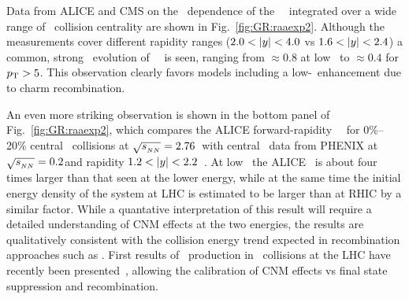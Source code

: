 Data from ALICE and CMS on the \pT\ dependence of the \jpsi\ \Raa\ integrated over a wide range of \PbPb\ collision centrality
are shown in Fig.~\ref{fig:GR:raaexp2}. Although the measurements
cover different rapidity ranges ($2.0 < |y| < 4.0$ vs $ 1.6  < |y| < 2.4 $)
a common, strong \pT\ evolution of \jpsi\ \Raa\ is seen, ranging from $\approx 0.8$ at low \pT\ to $\approx 0.4$ for $\mbox{$p_{\mathrm{T}}$} > 5$\GeVc.
This observation clearly favors models including a low-\pT\ enhancement due to charm recombination.

An even more striking observation is shown in the bottom panel of Fig.~\ref{fig:GR:raaexp2}, which compares
the ALICE forward-rapidity \jpsi\ \Raa\ for 0\%--20\% central \PbPb\ collisions at  $\sqrt{s_{_{NN}}} = 2.76$\TeV\
with central \AuAu\ data from PHENIX at $\sqrt{s_{_{NN}}} = 0.2$\GeV and rapidity $1.2 < |y| < 2.2$~\cite{Adare:2011yf}.
At low \pT\ the ALICE \Raa\ is about four times larger than that seen at the lower energy, while
at the same time the initial energy density of the system at LHC is estimated to be larger than at
RHIC by a similar factor. While a quantative interpretation of this result will require
a detailed understanding of CNM effects at the two energies, the results are qualitatively consistent
with the collision energy trend expected in recombination approaches such as
\cite{Zhao:2007hh,Zhou:2013aea,Liu:2009nb}.
First results of \jpsi\ production in \pPb\ collisions at the LHC have recently
been presented~\cite{Abelev:2013yxa,Aaij:2013zxa}, allowing
the calibration of CNM effects vs final state suppression and recombination.

